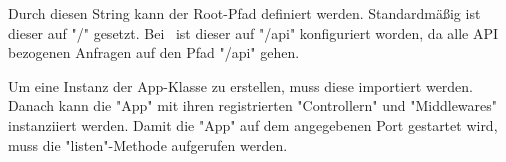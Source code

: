 
Durch diesen String kann der Root-Pfad definiert werden. Standardmäßig ist dieser auf "{\ttfamily /}" gesetzt. Bei \ZELIA\ ist dieser auf "{\ttfamily /api}" konfiguriert worden, da alle API bezogenen Anfragen auf den Pfad "{\ttfamily /api}" gehen.

Um eine Instanz der App-Klasse zu erstellen, muss diese importiert werden. Danach kann die "App" mit ihren registrierten "Controllern" und "Middlewares" instanziiert werden. Damit die "App" auf dem angegebenen Port gestartet wird, muss die "listen"-Methode aufgerufen werden.

